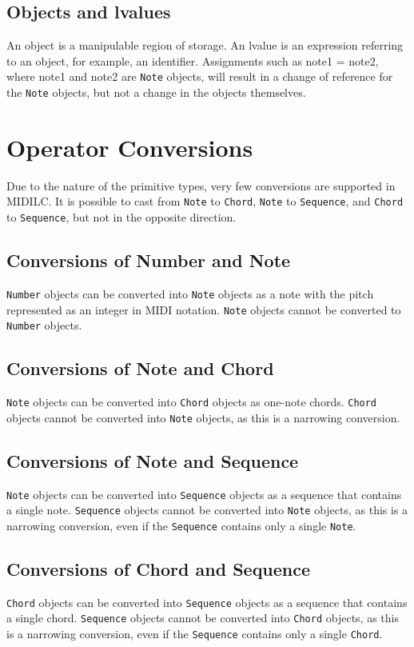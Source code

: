 \documentclass[12pt,A4]{book}
\begin{document}
\subsection{Objects and lvalues}
An object is a manipulable region of storage. An lvalue is an expression referring to an object, for example, an identifier. Assignments such as note1 = note2, where note1 and note2 are \verb|Note| objects, will result in a change of reference for the \verb|Note| objects, but not a change in the objects themselves.
\section{Operator Conversions}
Due to the nature of the primitive types, very few conversions are supported in MIDILC. It is possible to cast from \verb|Note| to \verb|Chord|, \verb|Note| to \verb|Sequence|, and \verb|Chord| to \verb|Sequence|, but not in the opposite direction.
\subsection{Conversions of Number and Note}
\verb|Number| objects can be converted into \verb|Note| objects as a note with the pitch represented as an integer in MIDI notation. \verb|Note| objects cannot be converted to \verb|Number| objects.
\subsection{Conversions of Note and Chord}
\verb|Note| objects can be converted into \verb|Chord| objects as one-note chords. \verb|Chord| objects cannot be converted into \verb|Note| objects, as this is a narrowing conversion.
\subsection{Conversions of Note and Sequence}
\verb|Note| objects can be converted into \verb|Sequence| objects as a sequence that contains a single note. \verb|Sequence| objects cannot be converted into \verb|Note| objects, as this is a narrowing conversion, even if the \verb|Sequence| contains only a single \verb|Note|.
\subsection{Conversions of Chord and Sequence}
\verb|Chord| objects can be converted into \verb|Sequence| objects as a sequence that contains a single chord. \verb|Sequence| objects cannot be converted into \verb|Chord| objects, as this is a narrowing conversion, even if the \verb|Sequence| contains only a single \verb|Chord|.
\end{document}
